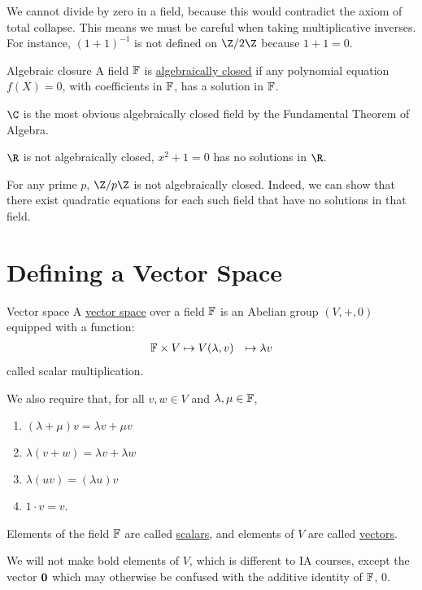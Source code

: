 \documentclass[../Main.tex]{subfiles}
\begin{document}
We cannot divide by zero in a field, because this would contradict the axiom of total collapse. This means we must be careful when taking multiplicative inverses. For instance, $(1 + 1)^{-1}$ is not defined on $\Z / 2\Z$ because $1 + 1 = 0$.
\begin{definition}{Algebraic closure}
    A field $\mathbb{F}$ is \underline{algebraically closed} if any polynomial equation $f(X) = 0$, with coefficients in $\mathbb{F}$, has a solution in $\mathbb{F}$.
\end{definition}
\begin{example}
    $\C$ is the most obvious algebraically closed field by the Fundamental Theorem of Algebra.
\end{example}
\begin{examples}
    \item $\R$ is not algebraically closed, $x^2 + 1 = 0$ has no solutions in $\R$.
    \item For any prime $p$, $\Z / p\Z$ is not algebraically closed. Indeed, we can show that there exist quadratic equations for each such field that have no solutions in that field.
\end{examples}
\section{Defining a Vector Space}
\begin{definition}{Vector space}
    A \underline{vector space} over a field $\mathbb{F}$ is an Abelian group $(V, +, 0)$ equipped with a function:
    \begin{align*}
        \mathbb{F} \times V &\mapsto V
        (\lambda, v) &\mapsto \lambda v
    \end{align*}
    called scalar multiplication.

    We also require that, for all $v, w \in V$ and $\lambda, \mu \in \mathbb{F}$,
    \begin{enumerate}
        \item $(\lambda + \mu)v = \lambda v + \mu v$
        \item $\lambda (v + w) = \lambda v + \lambda w$
        \item $\lambda (u v) = (\lambda u)v$
        \item $1 \cdot v = v$.
    \end{enumerate}
    Elements of the field $\mathbb{F}$ are called \underline{scalars}, and elements of $V$ are called \underline{vectors}.
\end{definition}
We will not make bold elements of $V$, which is different to IA courses, except the vector $\boldsymbol{0}$ which may otherwise be confused with the additive identity of $\mathbb{F}$, $0$.
\end{document}
